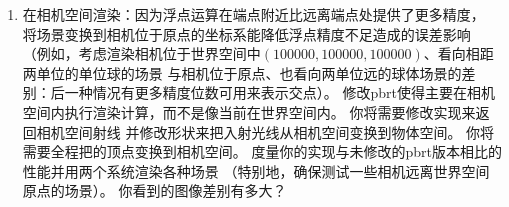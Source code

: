 \begin{enumerate}
    \item \circlethree 在相机空间渲染：因为浮点运算在端点附近比远离端点处提供了更多精度，
          将场景变换到相机位于原点的坐标系能降低浮点精度不足造成的误差影响
          （例如，考虑渲染相机位于世界空间中$(100000,100000,100000)$、看向相距两单位的单位球的场景
          与相机位于原点、也看向两单位远的球体场景的差别：后一种情况有更多精度位数可用来表示交点）。
          修改pbrt使得主要在相机空间内执行渲染计算，而不是像当前在世界空间内。
          你将需要修改实现来返回相机空间射线
          并修改形状来把入射光线从相机空间变换到物体空间。
          你将需要全程把的顶点变换到相机空间。
          度量你的实现与未修改的pbrt版本相比的性能并用两个系统渲染各种场景
          （特别地，确保测试一些相机远离世界空间原点的场景）。
          你看到的图像差别有多大？
\end{enumerate}